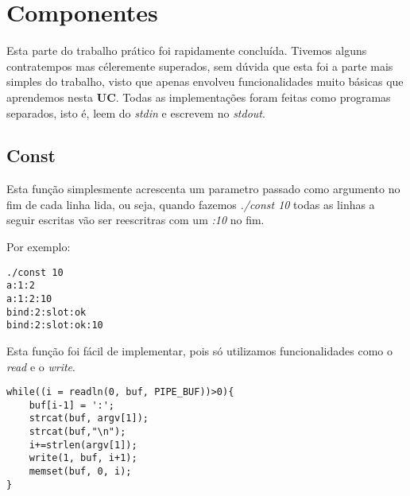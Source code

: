 \documentclass{article}
\begin{document}
\clearpage

\section{Componentes}
\par Esta parte do trabalho prático foi rapidamente concluída. Tivemos alguns contratempos mas céleremente superados, sem dúvida que esta foi a parte mais simples do trabalho, visto que apenas envolveu funcionalidades muito básicas que aprendemos nesta \textbf{UC}. Todas as implementações foram feitas como programas separados, isto é, leem do \emph{stdin} e escrevem no \emph{stdout}.
\subsection{Const}
\par Esta função simplesmente acrescenta um parametro passado como argumento no fim de cada linha lida, ou seja, quando fazemos \emph{./const 10} todas as linhas a seguir escritas vão ser reescritras com um \emph{:10} no fim.
\par Por exemplo:
\begin{lstlisting}
./const 10
a:1:2
a:1:2:10
bind:2:slot:ok
bind:2:slot:ok:10
\end{lstlisting}
Esta função foi fácil de implementar, pois só utilizamos funcionalidades como o \emph{read} e o \emph{write}.
\begin{lstlisting}
while((i = readln(0, buf, PIPE_BUF))>0){
	buf[i-1] = ':';
	strcat(buf, argv[1]);
    strcat(buf,"\n");
	i+=strlen(argv[1]);
	write(1, buf, i+1);
	memset(buf, 0, i);
}
\end{lstlisting}
\end{document}
